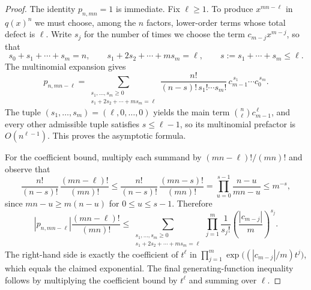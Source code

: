 \documentclass[10pt,a4paper]{amsart}
\begin{document}
\begin{proof}
The identity $p_{n,mn}=1$ is immediate.
Fix $\ell\ge1$.
To produce $x^{mn-\ell}$ in $q(x)^n$ we must choose, among the $n$ factors, lower-order terms whose total defect is $\ell$.
Write $s_j$ for the number of times we choose the term $c_{m-j}x^{m-j}$, so that
$$s_0+s_1+\cdots+s_m=n,
\qquad
s_1+2s_2+\cdots+ms_m=\ell,
\qquad
s:=s_1+\cdots+s_m\le \ell.$$
The multinomial expansion gives
$$p_{n,mn-\ell}
=\sum_{\substack{s_1,\dots,s_m\ge0\\ s_1+2s_2+\cdots+ms_m=\ell}}
\frac{n!}{(n-s)!\,s_1!\cdots s_m!}\,c_{m-1}^{\,s_1}\cdots c_0^{\,s_m}.$$
The tuple $(s_1,\dots,s_m)=(\ell,0,\dots,0)$ yields the main term $\binom{n}{\ell}c_{m-1}^{\,\ell}$, and every other admissible tuple satisfies $s\le \ell-1$, so its multinomial prefactor is $O(n^{\ell-1})$.
This proves the asymptotic formula.

For the coefficient bound, multiply each summand by $(mn-\ell)!/(mn)!$ and observe that
$$\frac{n!}{(n-s)!}\,\frac{(mn-\ell)!}{(mn)!}
\le \frac{n!}{(n-s)!}\,\frac{(mn-s)!}{(mn)!}
=\prod_{u=0}^{s-1}\frac{n-u}{mn-u}\le m^{-s},$$
since $mn-u\ge m(n-u)$ for $0\le u\le s-1$.
Therefore
$$\left|p_{n,mn-\ell}\right|\frac{(mn-\ell)!}{(mn)!}
\le \sum_{\substack{s_1,\dots,s_m\ge0\\ s_1+2s_2+\cdots+ms_m=\ell}}
\prod_{j=1}^{m}\frac{1}{s_j!}\left(\frac{|c_{m-j}|}{m}\right)^{s_j}.$$
The right-hand side is exactly the coefficient of $t^\ell$ in
$\prod_{j=1}^{m}\exp\!\bigl((|c_{m-j}|/m)t^j\bigr)$, which equals the claimed exponential.
The final generating-function inequality follows by multiplying the coefficient bound by $t^\ell$ and summing over $\ell$.
\end{proof}
\end{document}
